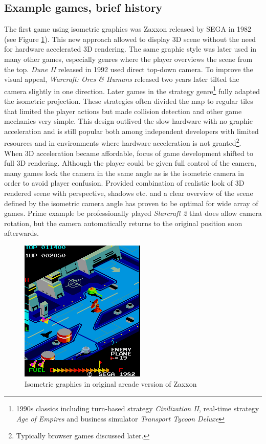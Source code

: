 \documentclass[11pt,oneside, final]{fithesis2}
\begin{document}
\subsection{Example games, brief history}
The first game using isometric graphics was Zaxxon released by SEGA in 1982\cite{zaxxon} (see Figure \ref{zaxxon}). This new approach allowed to display 3D scene without the need for hardware accelerated 3D rendering. The same graphic style was later used in many other games, especially genres where the player overviews the scene from the top. \emph{Dune II} released in 1992\cite{dune2} used direct top-down camera. To improve the visual appeal, \emph{Warcraft: Orcs \& Humans} released two years later\cite{blizzardlegacy} tilted the camera slightly in one direction. Later games in the strategy genre\footnote{1990s classics including turn-based strategy \emph{Civilization II}\cite{civ2}, real-time strategy \emph{Age of Empires}\cite{ageofempires} and business simulator \emph{Transport Tycoon Deluxe}\cite{ttd}} fully adapted the isometric projection. These strategies often divided the map to regular tiles that limited the player actions but made collision detection and other game mechanics very simple. This design outlived the slow hardware with no graphic acceleration and is still popular both among independent developers with limited resources and in environments where hardware acceleration is not granted\footnote{Typically browser games discussed later.}. When 3D acceleration became affordable, focus of game development shifted to full 3D rendering. Although the player could be given full control of the camera, many games lock the camera in the same angle as is the isometric camera in order to avoid player confusion. Provided combination of realistic look of 3D rendered scene with perspective, shadows etc. and a clear overview of the scene defined by the isometric camera angle has proven to be optimal for wide array of games. Prime example be professionally played \emph{Starcraft 2}\cite{sc2} that does allow camera rotation, but the camera automatically returns to the original position soon afterwards.

\begin{figure}[h]
	\centering
	\includegraphics{zaxxon}
	\caption{Isometric graphics in original arcade version of Zaxxon\cite{zaxxon}}
	\label{zaxxon}
\end{figure}
\end{document}
